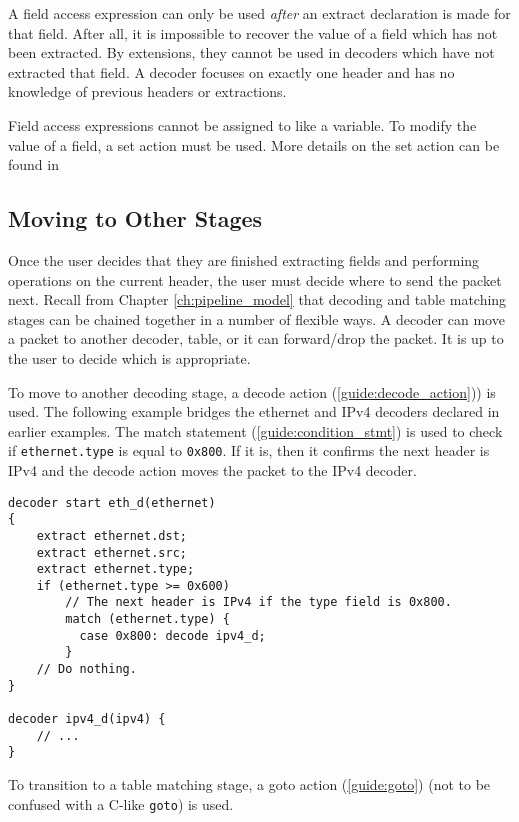 A field access expression can only be used \textit{after} an extract declaration
is made for that field. After all, it is impossible to recover the value of a
field which has not been extracted. By extensions, they cannot be used in
decoders which have not extracted that field. A decoder focuses on exactly one
header and has no knowledge of previous headers or extractions.

Field access expressions cannot be assigned to like a variable. To modify the
value of a field, a set action must be used. More details on the set action can be found in 

\subsection{Moving to Other Stages} \label{tut:decoder_next}

Once the user decides that they are finished extracting fields and performing operations on the current header, the user must decide where to send the packet next. Recall from Chapter \ref{ch:pipeline_model} that decoding and
table matching stages can be chained together in a number of flexible ways.
A decoder can move a packet to another decoder, table, or it can forward/drop
the packet. It is up to the user to decide which is appropriate.

To move to another decoding stage, a decode action (\ref{guide:decode_action}))
is used. The following example bridges the ethernet and IPv4 decoders
declared in earlier examples. The match statement
(\ref{guide:condition_stmt}) is used to check if \texttt{ethernet.type} is equal to
\texttt{0x800}. If it is, then it confirms the next header is IPv4 and the decode action moves the packet to the IPv4 decoder.

\begin{codepage}
\begin{lstlisting}
decoder start eth_d(ethernet)
{
	extract ethernet.dst;
	extract ethernet.src;
	extract ethernet.type;
	if (ethernet.type >= 0x600)
	  	// The next header is IPv4 if the type field is 0x800.
	    match (ethernet.type) {
	      case 0x800: decode ipv4_d;
	    }
	// Do nothing.
}

decoder ipv4_d(ipv4) {
	// ...
}
\end{lstlisting}
\end{codepage}

To transition to a table matching stage, a goto action (\ref{guide:goto}) (not
to be confused with a C-like \texttt{goto}) is used.

